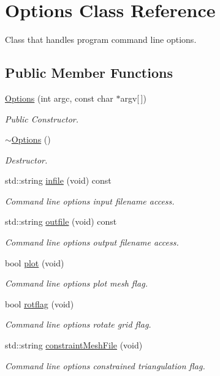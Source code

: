 \hypertarget{class_options}{}\section{Options Class Reference}
\label{class_options}


Class that handles program command line options.  


\subsection*{Public Member Functions}
\begin{DoxyCompactItemize}
\item 
\mbox{\hyperlink{class_options_af65f2f452a673db877590dbff53115ff}{Options}} (int argc, const char $\ast$argv\mbox{[}$\,$\mbox{]})
\begin{DoxyCompactList}\small\item\em Public Constructor. \end{DoxyCompactList}\item 
\mbox{\hyperlink{class_options_a86ddb85b183f8b58af5481f30a42fa92}{$\sim$\+Options}} ()
\begin{DoxyCompactList}\small\item\em Destructor. \end{DoxyCompactList}\item 
std\+::string \mbox{\hyperlink{class_options_af5fc0ecb4b117c5438f07762fa7f565a}{infile}} (void) const
\begin{DoxyCompactList}\small\item\em Command line options input filename access. \end{DoxyCompactList}\item 
std\+::string \mbox{\hyperlink{class_options_a35e8029289fef81902b98422e5b9aff8}{outfile}} (void) const
\begin{DoxyCompactList}\small\item\em Command line options output filename access. \end{DoxyCompactList}\item 
bool \mbox{\hyperlink{class_options_a6d00df300abbec9c39990eb8858f1255}{plot}} (void)
\begin{DoxyCompactList}\small\item\em Command line options plot mesh flag. \end{DoxyCompactList}\item 
bool \mbox{\hyperlink{class_options_a896737c665d9c0ee7a17a0cdedf66bb7}{rotflag}} (void)
\begin{DoxyCompactList}\small\item\em Command line options rotate grid flag. \end{DoxyCompactList}\item 
std\+::string \mbox{\hyperlink{class_options_a9a48486277bc0f417308735c88f06a21}{constraint\+Mesh\+File}} (void)
\begin{DoxyCompactList}\small\item\em Command line options constrained triangulation flag. \end{DoxyCompactList}\end{DoxyCompactItemize}
